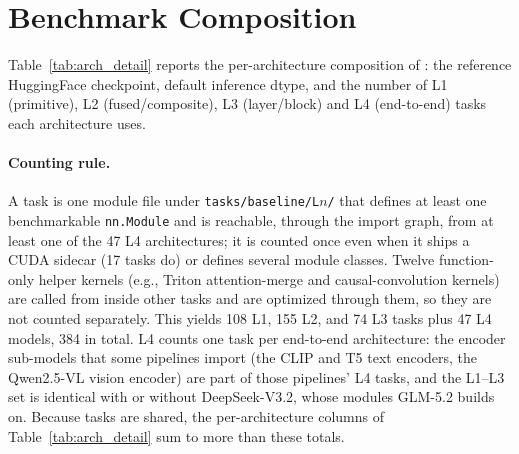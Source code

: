 
\section{Benchmark Composition}
\label{app:architectures}

Table~\ref{tab:arch_detail} reports the per-architecture composition of \fastkernels{}: the reference HuggingFace checkpoint, default inference dtype, and the number of L1 (primitive), L2 (fused/composite), L3 (layer/block) and L4 (end-to-end) tasks each architecture uses.

\paragraph{Counting rule.}
A task is one module file under \texttt{tasks/baseline/L$n$/} that defines at least one benchmarkable \texttt{nn.Module} and is reachable, through the import graph, from at least one of the 47 L4 architectures; it is counted once even when it ships a CUDA sidecar (17 tasks do) or defines several module classes.
Twelve function-only helper kernels (e.g., Triton attention-merge and causal-convolution kernels) are called from inside other tasks and are optimized through them, so they are not counted separately.
This yields 108 L1, 155 L2, and 74 L3 tasks plus 47 L4 models, 384 in total.
L4 counts one task per end-to-end architecture: the encoder sub-models that some pipelines import (the CLIP and T5 text encoders, the Qwen2.5-VL vision encoder) are part of those pipelines' L4 tasks, and the L1--L3 set is identical with or without DeepSeek-V3.2, whose modules GLM-5.2 builds on.
Because tasks are shared, the per-architecture columns of Table~\ref{tab:arch_detail} sum to more than these totals.

